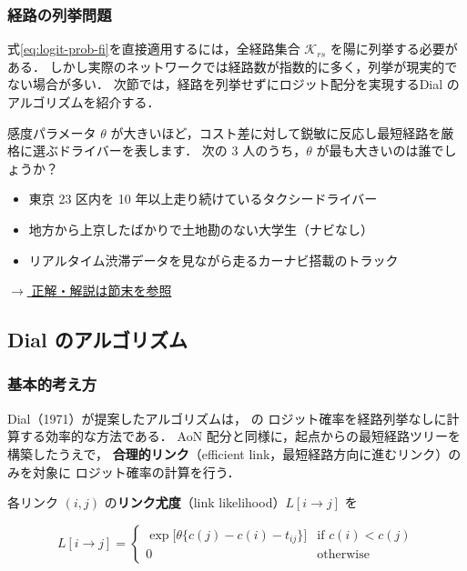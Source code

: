 \subsubsection*{経路の列挙問題}

式\eqref{eq:logit-prob-fi}を直接適用するには，全経路集合 $\mathcal{K}_{rs}$ を陽に列挙する必要がある．
しかし実際のネットワークでは経路数が指数的に多く，列挙が現実的でない場合が多い．
次節では，経路を列挙せずにロジット配分を実現するDial のアルゴリズムを紹介する．

\begin{example}[title={クイズ 3：あなたの $\theta$ はいくつですか？}]
感度パラメータ $\theta$ が大きいほど，コスト差に対して鋭敏に反応し最短経路を厳格に選ぶドライバーを表します．
次の 3 人のうち，$\theta$ が最も大きいのは誰でしょうか？
\begin{itemize}
  \item[(ア)] 東京 23 区内を 10 年以上走り続けているタクシードライバー
  \item[(イ)] 地方から上京したばかりで土地勘のない大学生（ナビなし）
  \item[(ウ)] リアルタイム渋滞データを見ながら走るカーナビ搭載のトラック
\end{itemize}
\hyperref[ans:q3]{$\rightarrow$ 正解・解説は節末を参照}
\end{example}

\subsection{Dial のアルゴリズム}
\label{subsec:dial-algorithm}

\subsubsection*{基本的考え方}

Dial（1971）が提案したアルゴリズムは， の
ロジット確率を経路列挙なしに計算する効率的な方法である\cite{Dial1971}．
AoN 配分と同様に，起点からの最短経路ツリーを構築したうえで，
\textbf{合理的リンク}（efficient link，最短経路方向に進むリンク）のみを対象に
ロジット確率の計算を行う．

各リンク $(i,j)$ の\textbf{リンク尤度}（link likelihood）$L[i \to j]$ を

\begin{equation}
  L[i \to j] =
  \begin{cases}
    \exp\!\bigl[\theta\{c(j) - c(i) - t_{ij}\}\bigr] & \text{if } c(i) < c(j) \\[4pt]
    0 & \text{otherwise}
  \end{cases}
  \label{eq:link-likelihood}
\end{equation}

